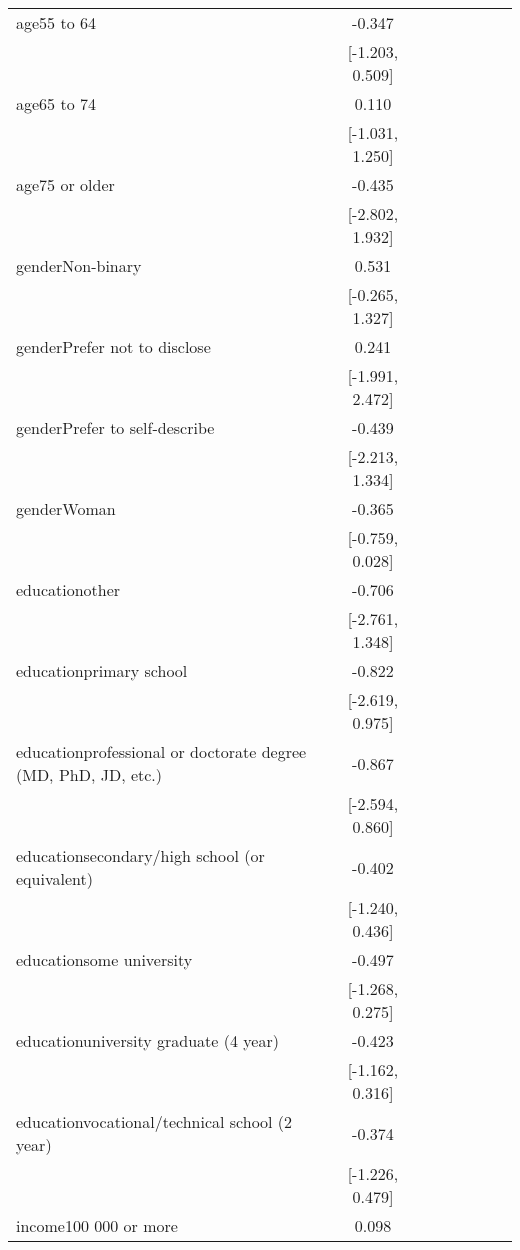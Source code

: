 \begin{tiny}
\begin{xltabular}{\textwidth}{lccccccc}
age55 to 64 & -0.347 &  &  &  &  &  &  \\ 
 & [-1.203, 0.509] &  &  &  &  &  &  \\ 
age65 to 74 & 0.110 &  &  &  &  &  &  \\ 
 & [-1.031, 1.250] &  &  &  &  &  &  \\ 
age75 or older & -0.435 &  &  &  &  &  &  \\ 
 & [-2.802, 1.932] &  &  &  &  &  &  \\ 
genderNon-binary & 0.531 &  &  &  &  &  &  \\ 
 & [-0.265, 1.327] &  &  &  &  &  &  \\ 
genderPrefer not to disclose & 0.241 &  &  &  &  &  &  \\ 
 & [-1.991, 2.472] &  &  &  &  &  &  \\ 
genderPrefer to self-describe & -0.439 &  &  &  &  &  &  \\ 
 & [-2.213, 1.334] &  &  &  &  &  &  \\ 
genderWoman & -0.365 &  &  &  &  &  &  \\ 
 & [-0.759, 0.028] &  &  &  &  &  &  \\ 
educationother & -0.706 &  &  &  &  &  &  \\ 
 & [-2.761, 1.348] &  &  &  &  &  &  \\ 
educationprimary school & -0.822 &  &  &  &  &  &  \\ 
 & [-2.619, 0.975] &  &  &  &  &  &  \\ 
educationprofessional or doctorate degree (MD, PhD, JD, etc.) & -0.867 &  &  &  &  &  &  \\ 
 & [-2.594, 0.860] &  &  &  &  &  &  \\ 
educationsecondary/high school (or equivalent) & -0.402 &  &  &  &  &  &  \\ 
 & [-1.240, 0.436] &  &  &  &  &  &  \\ 
educationsome university & -0.497 &  &  &  &  &  &  \\ 
 & [-1.268, 0.275] &  &  &  &  &  &  \\ 
educationuniversity graduate (4 year) & -0.423 &  &  &  &  &  &  \\ 
 & [-1.162, 0.316] &  &  &  &  &  &  \\ 
educationvocational/technical school (2 year) & -0.374 &  &  &  &  &  &  \\ 
 & [-1.226, 0.479] &  &  &  &  &  &  \\ 
income100 000 or more & 0.098 &  &  &  &  &  &  \\ 

\end{xltabular}
\end{tiny}
